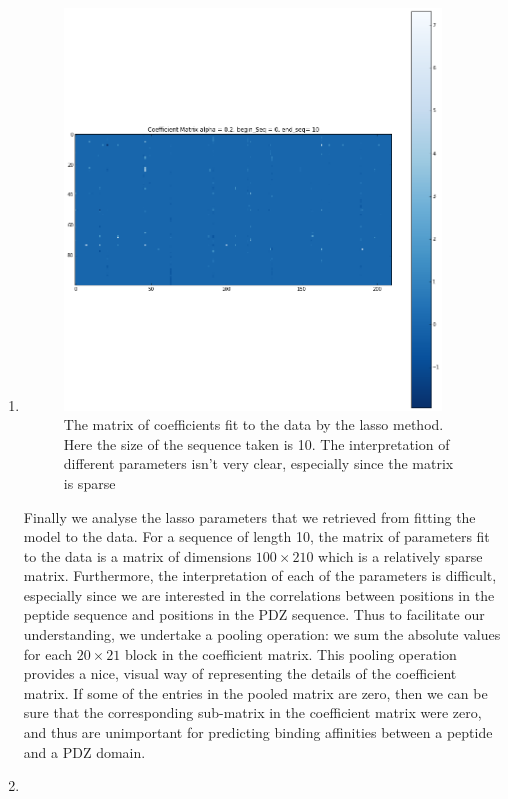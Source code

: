 \documentclass[a4paper, 12pt]{article}
\begin{document}
\begin{enumerate}
\item 

\begin{figure}[!h]
\centering 
\label{coefficient_matrix}
\includegraphics[width=10cm]{Images/coefficient_matrix_10.png}
\caption{The matrix of coefficients fit to the data by the lasso method. Here the size of the sequence taken is 10. The interpretation of different parameters isn't very clear, especially since the matrix is sparse}
\end{figure}

Finally we analyse the lasso parameters that we retrieved from fitting the model to the data. For a sequence of length 10, the matrix of parameters fit to the data is a matrix of dimensions $100 \times 210$ which is a relatively sparse matrix. Furthermore, the interpretation of each of the parameters is difficult, especially since we are interested in the correlations between positions in the peptide sequence and positions in the PDZ sequence. Thus to facilitate our understanding, we undertake a pooling operation: we sum the absolute values for each $20 \times 21 $ block in the coefficient matrix. This pooling operation provides a nice, visual way of representing the details of the coefficient matrix. If some of the entries in the pooled matrix are zero, then we can be sure that the corresponding sub-matrix in the coefficient matrix were zero, and thus are unimportant for predicting binding affinities between a peptide and a PDZ domain. 


\item 


\end{enumerate}
\end{document}
